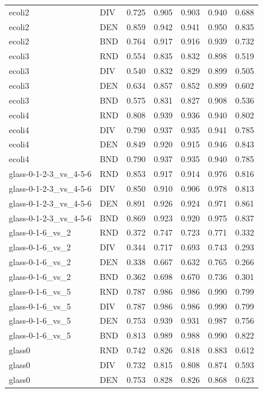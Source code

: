 \documentclass[10pt,a4paper]{article}
\begin{document}
\begin{longtable}{lllllrr}
ecoli2 & DIV & 0.725 & 0.905 & 0.903 & 0.940 & 0.688 \\
ecoli2 & DEN & 0.859 & 0.942 & 0.941 & 0.950 & 0.835 \\
ecoli2 & BND & 0.764 & 0.917 & 0.916 & 0.939 & 0.732 \\
ecoli3 & RND & 0.554 & 0.835 & 0.832 & 0.898 & 0.519 \\
ecoli3 & DIV & 0.540 & 0.832 & 0.829 & 0.899 & 0.505 \\
ecoli3 & DEN & 0.634 & 0.857 & 0.852 & 0.899 & 0.602 \\
ecoli3 & BND & 0.575 & 0.831 & 0.827 & 0.908 & 0.536 \\
ecoli4 & RND & 0.808 & 0.939 & 0.936 & 0.940 & 0.802 \\
ecoli4 & DIV & 0.790 & 0.937 & 0.935 & 0.941 & 0.785 \\
ecoli4 & DEN & 0.849 & 0.920 & 0.915 & 0.946 & 0.843 \\
ecoli4 & BND & 0.790 & 0.937 & 0.935 & 0.940 & 0.785 \\
glass-0-1-2-3\_vs\_4-5-6 & RND & 0.853 & 0.917 & 0.914 & 0.976 & 0.816 \\
glass-0-1-2-3\_vs\_4-5-6 & DIV & 0.850 & 0.910 & 0.906 & 0.978 & 0.813 \\
glass-0-1-2-3\_vs\_4-5-6 & DEN & 0.891 & 0.926 & 0.924 & 0.971 & 0.861 \\
glass-0-1-2-3\_vs\_4-5-6 & BND & 0.869 & 0.923 & 0.920 & 0.975 & 0.837 \\
glass-0-1-6\_vs\_2 & RND & 0.372 & 0.747 & 0.723 & 0.771 & 0.332 \\
glass-0-1-6\_vs\_2 & DIV & 0.344 & 0.717 & 0.693 & 0.743 & 0.293 \\
glass-0-1-6\_vs\_2 & DEN & 0.338 & 0.667 & 0.632 & 0.765 & 0.266 \\
glass-0-1-6\_vs\_2 & BND & 0.362 & 0.698 & 0.670 & 0.736 & 0.301 \\
glass-0-1-6\_vs\_5 & RND & 0.787 & 0.986 & 0.986 & 0.990 & 0.799 \\
glass-0-1-6\_vs\_5 & DIV & 0.787 & 0.986 & 0.986 & 0.990 & 0.799 \\
glass-0-1-6\_vs\_5 & DEN & 0.753 & 0.939 & 0.931 & 0.987 & 0.756 \\
glass-0-1-6\_vs\_5 & BND & 0.813 & 0.989 & 0.988 & 0.990 & 0.822 \\
glass0 & RND & 0.742 & 0.826 & 0.818 & 0.883 & 0.612 \\
glass0 & DIV & 0.732 & 0.815 & 0.808 & 0.874 & 0.593 \\
glass0 & DEN & 0.753 & 0.828 & 0.826 & 0.868 & 0.623 \\

\end{longtable}
\end{document}
